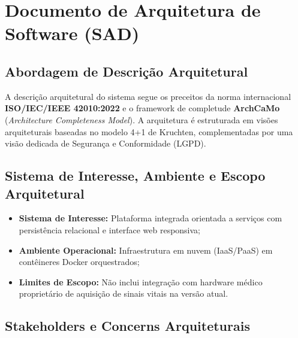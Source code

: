 \chapter{Documento de Arquitetura de Software (SAD)}
\label{chap:arquitetura_software}

\section{Abordagem de Descrição Arquitetural}
A descrição arquitetural do sistema segue os preceitos da norma internacional \textbf{ISO/IEC/IEEE 42010:2022} e o framework de completude \textbf{ArchCaMo} (\textit{Architecture Completeness Model}). A arquitetura é estruturada em visões arquiteturais baseadas no modelo 4+1 de Kruchten, complementadas por uma visão dedicada de Segurança e Conformidade (LGPD).

\section{Sistema de Interesse, Ambiente e Escopo Arquitetural}
\begin{itemize}
    \item \textbf{Sistema de Interesse:} Plataforma integrada orientada a serviços com persistência relacional e interface web responsiva;
    \item \textbf{Ambiente Operacional:} Infraestrutura em nuvem (IaaS/PaaS) em contêineres Docker orquestrados;
    \item \textbf{Limites de Escopo:} Não inclui integração com hardware médico proprietário de aquisição de sinais vitais na versão atual.
\end{itemize}

\section{Stakeholders e Concerns Arquiteturais}
